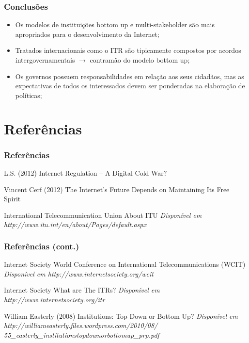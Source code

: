 \documentclass{beamer}
\begin{document}
\begin{frame}
\frametitle{Conclusões}
\begin{itemize}
\item Os modelos de instituições bottom up e multi-stakeholder são mais apropriados para o desenvolvimento da Internet;
\item Tratados internacionais como o ITR são tipicamente compostos por acordos intergovernamentais $\rightarrow$ contramão do modelo bottom up;
\item Os governos possuem responsabilidades em relação aos seus cidadãos, mas as expectativas de todos os interessados devem ser ponderadas na elaboração de políticas;
\end{itemize}
\end{frame}

\section{Referências}

\begin{frame}
\frametitle{Referências}
\footnotesize{
\begin{thebibliography}{99} %

 L.S. (2012)
\newblock Internet Regulation -- A Digital Cold War?

 Vincent Cerf (2012)
\newblock The Internet's Future Depends on Maintaining Its Free Spirit

 International Telecommunication Union
\newblock About ITU
\newblock \emph{Disponível em http://www.itu.int/en/about/Pages/default.aspx}

\end{thebibliography}
}
\end{frame}


\begin{frame}
\frametitle{Referências (cont.)}
\footnotesize{
\begin{thebibliography}{99} %

 Internet Society
\newblock World Conference on International Telecommunications (WCIT)
\newblock \emph{Disponível em http://www.internetsociety.org/wcit}

 Internet Society
\newblock What are The ITRs?
\newblock \emph{Disponível em http://www.internetsociety.org/itr}

 William Easterly (2008)
\newblock Institutions: Top Down or Bottom Up?
\newblock \emph{Disponível em http://williameasterly.files.wordpress.com/2010/08/
55\_easterly\_institutionstopdownorbottomup\_prp.pdf}

\end{thebibliography}
}
\end{frame}
\end{document}
